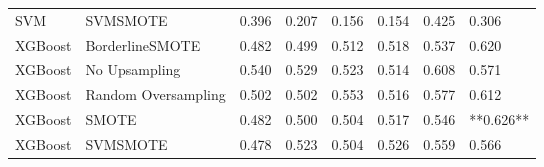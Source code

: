 \begin{tabular}{llllllll}
                            SVM &                      SVMSMOTE & 0.396 &                     0.207 &                 0.156 &                  0.154 &                                   0.425 &     0.306 \\
                        XGBoost &               BorderlineSMOTE & 0.482 &                     0.499 &                 0.512 &                  0.518 &                                   0.537 &     0.620 \\
                        XGBoost &                 No Upsampling & 0.540 &                     0.529 &                 0.523 &                  0.514 &                                   0.608 &     0.571 \\
                        XGBoost &           Random Oversampling & 0.502 &                     0.502 &                 0.553 &                  0.516 &                                   0.577 &     0.612 \\
                        XGBoost &                         SMOTE & 0.482 &                     0.500 &                 0.504 &                  0.517 &                                   0.546 & **0.626** \\
                        XGBoost &                      SVMSMOTE & 0.478 &                     0.523 &                 0.504 &                  0.526 &                                   0.559 &     0.566 \\
\bottomrule
\end{tabular}

